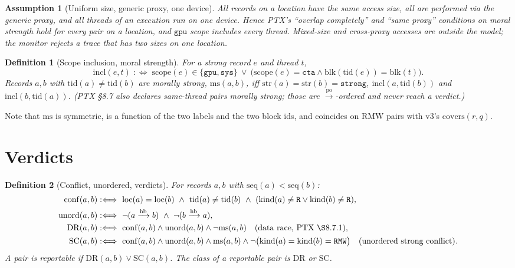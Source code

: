 \documentclass[11pt]{article}
\newtheorem{definition}{Definition}
\newtheorem{assumption}{Assumption}
\theoremstyle{remark}
\newcommand{\PO}{\xrightarrow{\mathrm{po}}}
\newcommand{\HB}{\xrightarrow{\mathrm{hb}}}
\newcommand{\tid}{\mathrm{tid}}
\newcommand{\loc}{\mathrm{loc}}
\newcommand{\kind}{\mathrm{kind}}
\newcommand{\str}{\mathrm{str}}
\newcommand{\scope}{\mathrm{scope}}
\newcommand{\blk}{\mathrm{blk}}
\newcommand{\incl}{\mathrm{incl}}
\newcommand{\ms}{\mathrm{ms}}
\newcommand{\conf}{\mathrm{conf}}
\newcommand{\unord}{\mathrm{unord}}
\newcommand{\DR}{\mathrm{DR}}
\newcommand{\SC}{\mathrm{SC}}
\newcommand{\seq}{\mathrm{seq}}
\begin{document}
\begin{assumption}[Uniform size, generic proxy, one device]\label{as:size}
All records on a location have the same access size, all are performed via the
generic proxy, and all threads of an execution run on one device. Hence PTX's
``overlap completely'' and ``same proxy'' conditions on moral strength hold
for every pair on a location, and $\mathtt{gpu}$ scope includes every thread.
Mixed-size and cross-proxy accesses are outside the model; the monitor rejects
a trace that has two sizes on one location.
\end{assumption}

\begin{definition}[Scope inclusion, moral strength]\label{def:ms}
For a strong record $e$ and thread $t$,
\[
\incl(e,t)\;:\Longleftrightarrow\;
\scope(e)\in\{\mathtt{gpu},\mathtt{sys}\}\ \vee\
\big(\scope(e)=\mathtt{cta}\wedge \blk(\tid(e))=\blk(t)\big).
\]
Records $a,b$ with $\tid(a)\ne\tid(b)$ are \emph{morally strong},
$\ms(a,b)$, iff $\str(a)=\str(b)=\mathtt{strong}$, $\incl(a,\tid(b))$ and
$\incl(b,\tid(a))$. (PTX \S8.7 also declares same-thread pairs morally
strong; those are $\PO$-ordered and never reach a verdict.)
\end{definition}

Note that $\ms$ is symmetric, is a function of the two labels and the two
block ids, and coincides on RMW pairs with v3's $\mathrm{covers}(r,q)$.

\section{Verdicts}

\begin{definition}[Conflict, unordered, verdicts]\label{def:verdict}
For records $a,b$ with $\seq(a)<\seq(b)$:
\begin{align*}
\conf(a,b)  &:\Longleftrightarrow\ \loc(a)=\loc(b)\ \wedge\ \tid(a)\ne\tid(b)\
             \wedge\ (\kind(a)\ne\mathtt{R}\vee\kind(b)\ne\mathtt{R}),\\
\unord(a,b) &:\Longleftrightarrow\ \neg(a\HB b)\ \wedge\ \neg(b\HB a),\\
\DR(a,b)    &:\Longleftrightarrow\ \conf(a,b)\wedge\unord(a,b)\wedge\neg\ms(a,b)
             \quad\text{(data race, PTX \S8.7.1)},\\
\SC(a,b)    &:\Longleftrightarrow\ \conf(a,b)\wedge\unord(a,b)\wedge\ms(a,b)
             \wedge\neg\big(\kind(a)=\kind(b)=\mathtt{RMW}\big)
             \quad\text{(unordered strong conflict)}.
\end{align*}
A pair is \emph{reportable} if $\DR(a,b)\vee\SC(a,b)$. The \emph{class} of a
reportable pair is $\DR$ or $\SC$.
\end{definition}
\end{document}
